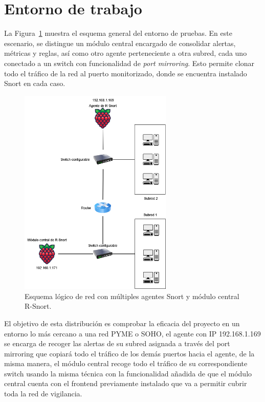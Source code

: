 \documentclass[11pt,a4paper,twoside]{report}
\begin{document}
\section{Entorno de trabajo}

La Figura~\ref{fig:esquema-red} muestra el esquema general del entorno de pruebas. En este escenario, se distingue un módulo central encargado de consolidar alertas, métricas y reglas, así como otro agente perteneciente a otra subred, cada uno conectado a un switch con funcionalidad de \textit{port mirroring}. Esto permite clonar todo el tráfico de la red al puerto monitorizado, donde se encuentra instalado Snort en cada caso.

\begin{figure}[H]
	\centering
	\includegraphics[width=0.65\textwidth]{documento/esquema_red.png}
	\caption{Esquema lógico de red con múltiples agentes Snort y módulo central R-Snort.}
	\label{fig:esquema-red}
\end{figure}

\newpage

El objetivo de esta distribución es comprobar la eficacia del proyecto en un entorno lo más cercano a una red PYME o SOHO, el agente con IP 192.168.1.169 se encarga de recoger las alertas de su subred asignada a través del port mirroring que copiará todo el tráfico de los demás puertos hacia el agente, de la misma manera, el módulo central recoge todo el tráfico de su correspondiente switch usando la misma técnica con la funcionalidad añadida de que el módulo central cuenta con el frontend previamente instalado que va a permitir cubrir toda la red de vigilancia.\newline
\end{document}
